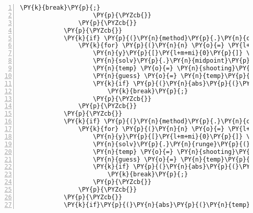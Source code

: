 \begin{Verbatim}[commandchars=\\\{\},numbers=left,firstnumber=1,stepnumber=1]
						\PY{k}{break}\PY{p}{;}
					\PY{p}{\PYZcb{}}
				\PY{p}{\PYZcb{}}
			\PY{p}{\PYZcb{}}
			\PY{k}{if} \PY{p}{(}\PY{n}{method}\PY{p}{.}\PY{n}{compare}\PY{p}{(}\PY{l+s}{\PYZdq{}}\PY{l+s}{midpoint}\PY{l+s}{\PYZdq{}}\PY{p}{)} \PY{o}{=}\PY{o}{=} \PY{l+m+mi}{0}\PY{p}{)}\PY{p}{\PYZob{}}
				\PY{k}{for} \PY{p}{(}\PY{n}{n} \PY{o}{=} \PY{l+m+mi}{0}\PY{p}{;} \PY{n}{n} \PY{o}{\PYZlt{}} \PY{l+m+mi}{500}\PY{p}{;} \PY{n}{n}\PY{o}{+}\PY{o}{+}\PY{p}{)}\PY{p}{\PYZob{}}
					\PY{n}{y}\PY{p}{[}\PY{l+m+mi}{0}\PY{p}{]} \PY{o}{=} \PY{l+m+mf}{0.}\PY{p}{;} \PY{n}{y}\PY{p}{[}\PY{l+m+mi}{1}\PY{p}{]} \PY{o}{=} \PY{n}{guess}\PY{p}{;} \PY{n}{y}\PY{p}{[}\PY{l+m+mi}{2}\PY{p}{]} \PY{o}{=} \PY{l+m+mf}{0.}\PY{p}{;} \PY{n}{y}\PY{p}{[}\PY{l+m+mi}{3}\PY{p}{]} \PY{o}{=} \PY{l+m+mf}{1.}\PY{p}{;}
					\PY{n}{solv}\PY{p}{.}\PY{n}{midpoint}\PY{p}{(}\PY{n}{y}\PY{p}{,} \PY{n}{f}\PY{p}{,} \PY{n}{j}\PY{p}{)}\PY{p}{;}
					\PY{n}{temp} \PY{o}{=} \PY{n}{shooting}\PY{p}{(}\PY{n}{guess}\PY{p}{,} \PY{n}{y}\PY{p}{,} \PY{n}{d}\PY{p}{)}\PY{p}{;}
					\PY{n}{guess} \PY{o}{=} \PY{n}{temp}\PY{p}{[}\PY{l+m+mi}{0}\PY{p}{]}\PY{p}{;}
					\PY{k}{if} \PY{p}{(}\PY{n}{abs}\PY{p}{(}\PY{n}{temp}\PY{p}{[}\PY{l+m+mi}{1}\PY{p}{]}\PY{p}{)}\PY{o}{\PYZlt{}}\PY{n}{tol}\PY{p}{)}\PY{p}{\PYZob{}}
						\PY{k}{break}\PY{p}{;}
					\PY{p}{\PYZcb{}}
				\PY{p}{\PYZcb{}}
			\PY{p}{\PYZcb{}}
			\PY{k}{if} \PY{p}{(}\PY{n}{method}\PY{p}{.}\PY{n}{compare}\PY{p}{(}\PY{l+s}{\PYZdq{}}\PY{l+s}{runge\PYZhy{}kutta}\PY{l+s}{\PYZdq{}}\PY{p}{)} \PY{o}{=}\PY{o}{=} \PY{l+m+mi}{0}\PY{p}{)}\PY{p}{\PYZob{}}
				\PY{k}{for} \PY{p}{(}\PY{n}{n} \PY{o}{=} \PY{l+m+mi}{0}\PY{p}{;} \PY{n}{n} \PY{o}{\PYZlt{}} \PY{l+m+mi}{500}\PY{p}{;} \PY{n}{n}\PY{o}{+}\PY{o}{+}\PY{p}{)}\PY{p}{\PYZob{}}
					\PY{n}{y}\PY{p}{[}\PY{l+m+mi}{0}\PY{p}{]} \PY{o}{=} \PY{l+m+mf}{0.}\PY{p}{;} \PY{n}{y}\PY{p}{[}\PY{l+m+mi}{1}\PY{p}{]} \PY{o}{=} \PY{n}{guess}\PY{p}{;} \PY{n}{y}\PY{p}{[}\PY{l+m+mi}{2}\PY{p}{]} \PY{o}{=} \PY{l+m+mf}{0.}\PY{p}{;} \PY{n}{y}\PY{p}{[}\PY{l+m+mi}{3}\PY{p}{]} \PY{o}{=} \PY{l+m+mf}{1.}\PY{p}{;}
					\PY{n}{solv}\PY{p}{.}\PY{n}{runge}\PY{p}{(}\PY{n}{y}\PY{p}{,} \PY{n}{f}\PY{p}{,} \PY{n}{j}\PY{p}{)}\PY{p}{;}
					\PY{n}{temp} \PY{o}{=} \PY{n}{shooting}\PY{p}{(}\PY{n}{guess}\PY{p}{,} \PY{n}{y}\PY{p}{,} \PY{n}{d}\PY{p}{)}\PY{p}{;}
					\PY{n}{guess} \PY{o}{=} \PY{n}{temp}\PY{p}{[}\PY{l+m+mi}{0}\PY{p}{]}\PY{p}{;}
					\PY{k}{if} \PY{p}{(}\PY{n}{abs}\PY{p}{(}\PY{n}{temp}\PY{p}{[}\PY{l+m+mi}{1}\PY{p}{]}\PY{p}{)}\PY{o}{\PYZlt{}}\PY{n}{tol}\PY{p}{)}\PY{p}{\PYZob{}}
						\PY{k}{break}\PY{p}{;}
					\PY{p}{\PYZcb{}}
				\PY{p}{\PYZcb{}}
			\PY{p}{\PYZcb{}}
			\PY{k}{if}\PY{p}{(}\PY{n}{abs}\PY{p}{(}\PY{n}{temp}\PY{p}{[}\PY{l+m+mi}{1}\PY{p}{]}\PY{p}{)}\PY{o}{\PYZgt{}}\PY{l+m+mf}{1.}\PY{p}{)}\PY{p}{\PYZob{}} \PY{c+c1}{// deal with being unable to find the root}

\end{Verbatim}
